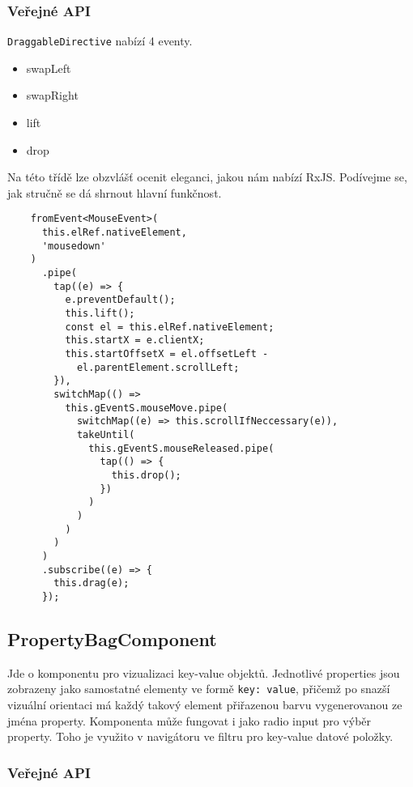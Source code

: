 \subsubsection*{Veřejné API}

\lstinline|DraggableDirective| nabízí 4 eventy.

\begin{itemize}
  \item swapLeft
  \item swapRight
  \item lift
  \item drop
\end{itemize}

\begin{remark}
  Na této třídě lze obzvlášť ocenit eleganci, jakou nám nabízí RxJS. Podívejme se, jak stručně se dá shrnout hlavní funkčnost.

  \begin{lstlisting}
    fromEvent<MouseEvent>(
      this.elRef.nativeElement, 
      'mousedown'
    )
      .pipe(
        tap((e) => {
          e.preventDefault();
          this.lift();
          const el = this.elRef.nativeElement;
          this.startX = e.clientX;
          this.startOffsetX = el.offsetLeft -
            el.parentElement.scrollLeft;
        }),
        switchMap(() =>
          this.gEventS.mouseMove.pipe(
            switchMap((e) => this.scrollIfNeccessary(e)),
            takeUntil(
              this.gEventS.mouseReleased.pipe(
                tap(() => {
                  this.drop();
                })
              )
            )
          )
        )
      )
      .subscribe((e) => {
        this.drag(e);
      });
  \end{lstlisting}
\end{remark}

\subsection{PropertyBagComponent}

Jde o komponentu pro vizualizaci key-value objektů. Jednotlivé properties jsou zobrazeny jako samostatné elementy ve formě \lstinline|key: value|, přičemž po snazší vizuální orientaci má každý takový element přiřazenou barvu vygenerovanou ze jména property. Komponenta může fungovat i jako radio input pro výběr property. Toho je využito v navigátoru ve filtru pro key-value datové položky.

\subsubsection*{Veřejné API}

